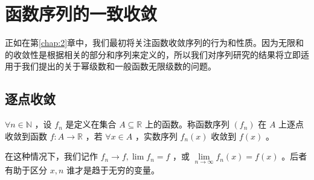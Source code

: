 \section{函数序列的一致收敛}
\label{sec:6.2}
正如在第\ref{chap:2}章中，我们最初将关注函数收敛序列的行为和性质。因为无限和的收敛性是根据相关的部分和序列来定义的，所以我们对序列研究的结果将立即适用于我们提出的关于幂级数和一般函数无限级数的问题。

\subsection{逐点收敛}

\begin{Def}\label{def:6.2.1}
  \(\forall n \in  \mathbb{N}\) ，设 \({f}_{n}\) 是定义在集合 \(A \subseteq  \mathbb{R}\) 上的函数。称函数序列 \(\left( {f}_{n}\right)\) 在 \(A\) 上逐点收敛到函数 \(f : A \rightarrow  \mathbb{R}\) ，若 \(\forall x \in  A\) ，实数序列 \({f}_{n}\left( x\right)\) 收敛到 \(f\left( x\right)\) 。
\end{Def}

在这种情况下，我们记作 \({f}_{n} \rightarrow  f,\lim {f}_{n} = f\) ，或 \(\mathop{\lim }\limits_{{n \rightarrow  \infty }}{f}_{n}\left( x\right)  = f\left( x\right)\) 。后者有助于区分 $x,n$ 谁才是趋于无穷的变量。 


